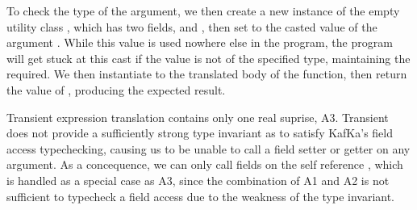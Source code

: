 \documentclass[a4paper,USenglish]{tex/lipics-v2016}
\begin{document}
To check the type of the argument, we then create a new instance of the empty utility class , which has two fields,  and , then set  to the casted value of the argument \x. While this value is used nowhere else in the program, the program will get stuck at this cast if the value is not of the specified type, maintaining the required. We then instantiate  to the translated body of the function, then return the value of , producing the expected result. 


\begin{mathpar}





\end{mathpar}

Transient expression translation contains only one real suprise, A3. Transient does not provide a sufficiently strong type invariant as to satisfy KafKa's field access typechecking, causing us to be unable to call a field setter or getter on any argument. As a concequence, we can only call fields on the self reference \this, which is handled as a special case as A3, since the combination of A1 and A2 is not sufficient to typecheck a field access due to the weakness of the type invariant.

\begin{mathpar}

\end{mathpar}
\end{document}

